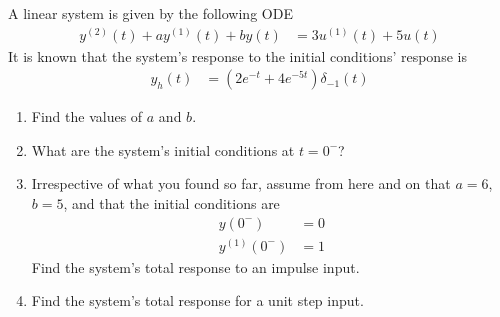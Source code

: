 \documentclass[fleqn, a4paper, 11pt, oneside]{amsart}
\theoremstyle{definition}
\theoremstyle{theorem}
\begin{document}
\begin{question}
	A linear system is given by the following ODE
	\begin{align*}
		y^{(2)}(t) + a y^{(1)}(t) + b y(t) & = 3 u^{(1)}(t) + 5 u(t)
	\end{align*}
	It is known that the system's response to the initial conditions' response is
	\begin{align*}
		y_h(t) & = \left( 2 e^{-t} + 4 e^{-5 t} \right) \delta_{-1}(t)
	\end{align*}
	\begin{enumerate}
		\item
			Find the values of $a$ and $b$.
		\item
			What are the system's initial conditions at $t = 0^-$?
		\item
			Irrespective of what you found so far, assume from here and on that $a = 6$, $b = 5$, and that the initial conditions are 
			\begin{align*}
				y(0^-)       & = 0 \\
				y^{(1)}(0^-) & = 1
			\end{align*}
			Find the system's total response to an impulse input.
		\item
			Find the system's total response for a unit step input.
	\end{enumerate}
\end{question}
\end{document}
